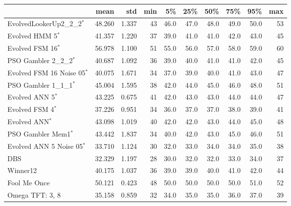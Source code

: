\begin{tabular}{lrrrrrrrrr}
\toprule
{} &    mean &    std &  min &    5\% &   25\% &   50\% &   75\% &   95\% &  max \\
\midrule
EvolvedLookerUp2\_2\_2$^{*}$    &  48.260 &  1.337 &   43 &  46.0 &  47.0 &  48.0 &  49.0 &  50.0 &   53 \\
Evolved HMM 5$^{*}$           &  41.357 &  1.220 &   37 &  39.0 &  41.0 &  41.0 &  42.0 &  43.0 &   45 \\
Evolved FSM 16$^{*}$          &  56.978 &  1.100 &   51 &  55.0 &  56.0 &  57.0 &  58.0 &  59.0 &   60 \\
PSO Gambler 2\_2\_2$^{*}$       &  40.687 &  1.092 &   36 &  39.0 &  40.0 &  41.0 &  41.0 &  42.0 &   45 \\
Evolved FSM 16 Noise 05$^{*}$ &  40.075 &  1.671 &   34 &  37.0 &  39.0 &  40.0 &  41.0 &  43.0 &   47 \\
PSO Gambler 1\_1\_1$^{*}$       &  45.004 &  1.595 &   38 &  42.0 &  44.0 &  45.0 &  46.0 &  48.0 &   51 \\
Evolved ANN 5$^{*}$           &  43.225 &  0.675 &   41 &  42.0 &  43.0 &  43.0 &  44.0 &  44.0 &   47 \\
Evolved FSM 4$^{*}$           &  37.226 &  0.951 &   34 &  36.0 &  37.0 &  37.0 &  38.0 &  39.0 &   41 \\
Evolved ANN$^{*}$             &  43.098 &  1.019 &   40 &  42.0 &  42.0 &  43.0 &  44.0 &  45.0 &   48 \\
PSO Gambler Mem1$^{*}$        &  43.442 &  1.837 &   34 &  40.0 &  42.0 &  43.0 &  45.0 &  46.0 &   51 \\
Evolved ANN 5 Noise 05$^{*}$  &  33.710 &  1.124 &   30 &  32.0 &  33.0 &  34.0 &  34.0 &  35.0 &   38 \\
DBS                           &  32.329 &  1.197 &   28 &  30.0 &  32.0 &  32.0 &  33.0 &  34.0 &   37 \\
Winner12                      &  40.175 &  1.037 &   36 &  39.0 &  39.0 &  40.0 &  41.0 &  42.0 &   44 \\
Fool Me Once                  &  50.121 &  0.423 &   48 &  50.0 &  50.0 &  50.0 &  50.0 &  51.0 &   52 \\
Omega TFT: 3, 8               &  35.158 &  0.859 &   32 &  34.0 &  35.0 &  35.0 &  36.0 &  37.0 &   39 \\
\bottomrule
\end{tabular}
